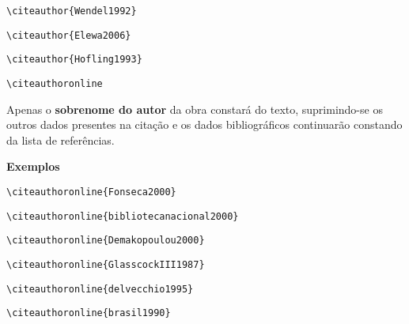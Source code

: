 \begin{alineas}
\begin{verbatim}
\citeauthor{Wendel1992}
\end{verbatim}
\citeauthor{Wendel1992}

\begin{verbatim}
\citeauthor{Elewa2006}
\end{verbatim}
\citeauthor{Elewa2006}

\begin{verbatim}
\citeauthor{Hofling1993}
\end{verbatim}
\citeauthor{Hofling1993}


\item
\begin{verbatim}
\citeauthoronline
\end{verbatim}

Apenas o \textbf{sobrenome do autor} da obra constará do texto, suprimindo-se os outros dados presentes na citação e os dados bibliográficos continuarão constando da lista de referências.

\textbf{Exemplos}

\begin{verbatim}
\citeauthoronline{Fonseca2000}
\end{verbatim}

\begin{verbatim}
\citeauthoronline{bibliotecanacional2000}
\end{verbatim}

\begin{verbatim}
\citeauthoronline{Demakopoulou2000}
\end{verbatim}

\begin{verbatim}
\citeauthoronline{GlasscockIII1987}
\end{verbatim}

\begin{verbatim}
\citeauthoronline{delvecchio1995}
\end{verbatim}

\begin{verbatim}
\citeauthoronline{brasil1990}
\end{verbatim}


\end{alineas}
